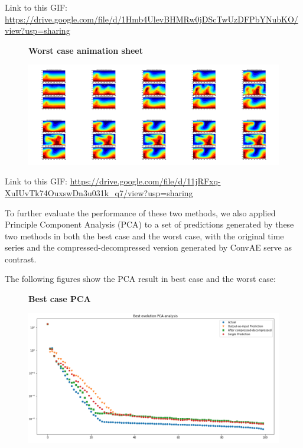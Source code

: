Link to this GIF: \url{https://drive.google.com/file/d/1Hmb4UlevBHMRw0jDScTwUzDFPbYNubKO/view?usp=sharing}

\begin{figure}[H]
    \centering
    \textbf{Worst case animation sheet}\par\medskip
    \includegraphics[scale=0.10]{Report LaTeX/figures/mantle_convection_images/Worst_case_GIF_sheet_FNN.png}
\end{figure}

Link to this GIF: 
\url{https://drive.google.com/file/d/11jRFxq-XuIUvTk74OuxswDn3u031k_q7/view?usp=sharing}

To further evaluate the performance of these two methods, we also applied Principle Component Analysis (PCA) to a set of predictions generated by these two methods in both the best case and the worst case, with the original time series and the compressed-decompressed version generated by ConvAE serve as contrast.

The following figures show the PCA result in best case and the worst case:

\begin{figure}[H]
    \textbf{Best case PCA}\par\medskip
    \includegraphics[scale=0.5]{Report LaTeX/figures/mantle_convection_images/Best_case_PCA_FNN.png}
\end{figure}

